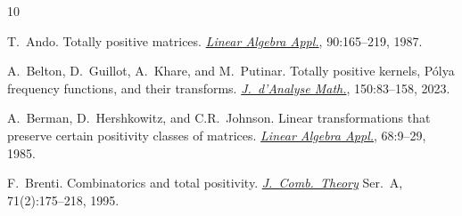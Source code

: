 \documentclass[11pt,reqno]{amsart}
\theoremstyle{plain}
\theoremstyle{definition}
\numberwithin{equation}{section}
\begin{document}
	\begin{thebibliography}{10}
		
		T.~Ando.
		\newblock Totally positive matrices.
		\newblock \href{https://doi.org/10.1016/0024-3795(87)90313-2}{\em Linear Algebra Appl.}, 90:165--219, 1987.
		
		
		
		A.~Belton, D.~Guillot, A.~Khare, and M.~Putinar.
		\newblock Totally positive kernels, P\'olya frequency functions, and their transforms.
		\href{https://doi.org/10.1007/s11854-022-0259-7}{\em J.\ d'Analyse Math.}, 150:83--158, 2023.
		
		
		
		A.~Berman, D.~Hershkowitz, and C.R.~Johnson.
		\newblock Linear transformations that preserve certain positivity classes of matrices.
		\newblock \href{https://doi.org/10.1016/0024-3795(85)90205-8}{\em Linear Algebra Appl.}, 68:9--29, 1985.
		
		
		F.~Brenti.
		\newblock Combinatorics and total positivity.
		\newblock \href{http://dx.doi.org/10.1016/0097-3165(95)90000-4}
		{\em J.\ Comb.\ Theory} Ser.~A, 71(2):175--218, 1995.
		
		

\end{thebibliography}
\end{document}
